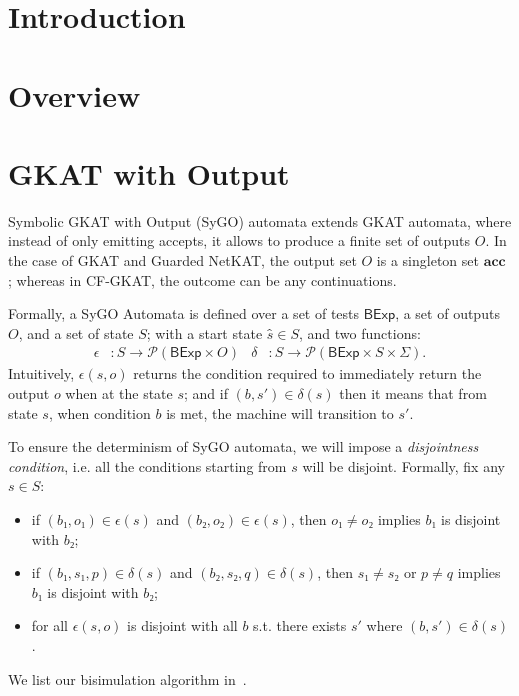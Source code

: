 \documentclass[manuscript,screen,review,anonymous]{acmart}
\newcommand{\conti}[1]{\mathbf{#1}}
\newcommand{\acc}[1]{{\conti{acc} ~ #1}}  %
\newcommand{\theoryOf}[1]{\ensuremath{\mathsf{#1}}}
\newcommand{\BExp}{\theoryOf{BExp}}
\begin{document}
\section{Introduction}

\section{Overview}

\section{GKAT with Output}

Symbolic GKAT with Output (SyGO) automata extends GKAT automata, where instead of only emitting accepts, it allows to produce a finite set of outputs \(O\).
In the case of GKAT and Guarded NetKAT, the output set \(O\) is a singleton set \(\acc{}\); whereas in CF-GKAT, the outcome can be any continuations.

Formally, a SyGO Automata is defined over a set of tests \(\BExp\), a set of outputs \(O\), and a set of state \(S\);  
with a start state \(ŝ ∈ S\), and two functions:
\begin{align*}
  ϵ & : S → 𝒫(\BExp × O) & 
  δ & : S → 𝒫(\BExp × S × Σ).
\end{align*}
Intuitively, \(ϵ(s, o)\) returns the condition required to immediately return the output \(o\) when at the state \(s\); and if \((b, s') ∈ δ(s)\) then it means that from state \(s\), when condition \(b\) is met, the machine will transition to \(s'\).

To ensure the determinism of SyGO automata, we will impose a \emph{disjointness condition}, i.e. all the conditions starting from \(s\) will be disjoint.
Formally, fix any \(s ∈ S\):
\begin{itemize}
  \item if \((b₁, o₁) ∈ ϵ(s)\) and \((b₂, o₂) ∈ ϵ(s)\), then \(o₁ ≠ o₂\) implies \(b₁\) is disjoint with \(b₂\);
  \item if \((b₁, s₁, p) ∈ δ(s)\) and \((b₂, s₂, q) ∈ δ(s)\), then \(s₁ ≠ s₂\) or \(p ≠ q\) implies \(b₁\) is disjoint with \(b₂\);
  \item for all \(ϵ(s, o)\) is disjoint with all \(b\) s.t. there exists \(s'\) where \((b, s') ∈ δ(s)\).
\end{itemize}

We list our bisimulation algorithm in~.
\end{document}
